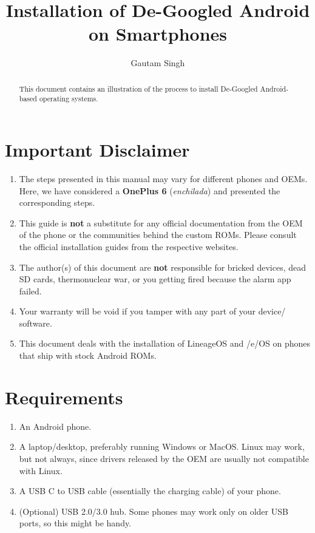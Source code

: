 \documentclass[journal,12pt,twocolumn]{IEEEtran}
\renewcommand\thesection{\arabic{section}}
\begin{document}
\vspace{3cm}
\title{Installation of De-Googled Android on Smartphones}
\author{Gautam Singh}
\maketitle
\tableofcontents
\bigskip

\begin{abstract}
    This document contains an illustration of the process to install
    De-Googled Android-based operating systems.
\end{abstract}

\section{Important Disclaimer}

\begin{enumerate}[label=\thesection.\arabic*
,ref=\thesection.\theenumi]
\item The steps presented in this manual may vary for different phones and 
OEMs. Here, we have considered a \textbf{OnePlus 6} (\textit{enchilada}) and
presented the corresponding steps.
\item This guide is \textbf{not} a substitute for any official documentation
from the OEM of the phone or the communities behind the custom ROMs. Please
consult the official installation guides from the respective websites.
\item The author(s) of this document are \textbf{not} responsible for bricked 
devices, dead SD cards, thermonuclear war, or you getting fired because the 
alarm app failed.
\item Your warranty will be void if you tamper with any part of your device/ 
software.
\item This document deals with the installation of LineageOS and /e/OS on
phones that ship with stock Android ROMs.
\end{enumerate}

\section{Requirements}

\begin{enumerate}[label=\thesection.\arabic*
,ref=\thesection.\theenumi]
\item An Android phone.
\item A laptop/desktop, preferably running Windows or MacOS. Linux may work, 
but not always, since drivers released by the OEM are usually not
compatible with Linux.
\item A USB C to USB cable (essentially the charging cable) of your
phone.
\item (Optional) USB 2.0/3.0 hub. Some phones may work only on older USB
ports, so this might be handy.
\end{enumerate}
\end{document}
